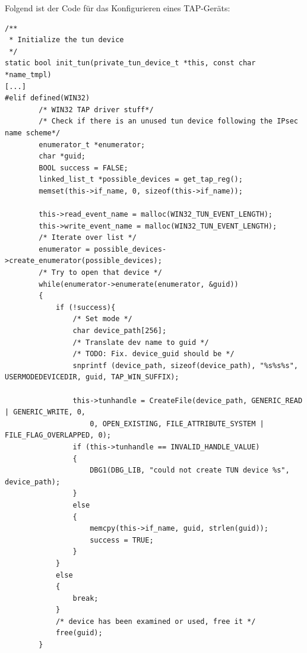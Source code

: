 Folgend ist der Code für das Konfigurieren eines TAP-Geräts:
\begin{lstlisting}[caption=Konfiguration eines TAP-Geräts]
/**
 * Initialize the tun device
 */
static bool init_tun(private_tun_device_t *this, const char *name_tmpl)
[...]
#elif defined(WIN32)
        /* WIN32 TAP driver stuff*/
        /* Check if there is an unused tun device following the IPsec name scheme*/
        enumerator_t *enumerator;
        char *guid;
        BOOL success = FALSE;
        linked_list_t *possible_devices = get_tap_reg();
        memset(this->if_name, 0, sizeof(this->if_name));

        this->read_event_name = malloc(WIN32_TUN_EVENT_LENGTH);
        this->write_event_name = malloc(WIN32_TUN_EVENT_LENGTH);
        /* Iterate over list */
        enumerator = possible_devices->create_enumerator(possible_devices);
        /* Try to open that device */
        while(enumerator->enumerate(enumerator, &guid))
        {
            if (!success){
                /* Set mode */
                char device_path[256];
                /* Translate dev name to guid */
                /* TODO: Fix. device_guid should be */
                snprintf (device_path, sizeof(device_path), "%s%s%s", USERMODEDEVICEDIR, guid, TAP_WIN_SUFFIX);

                this->tunhandle = CreateFile(device_path, GENERIC_READ | GENERIC_WRITE, 0,
                    0, OPEN_EXISTING, FILE_ATTRIBUTE_SYSTEM | FILE_FLAG_OVERLAPPED, 0);
                if (this->tunhandle == INVALID_HANDLE_VALUE)
                {
                    DBG1(DBG_LIB, "could not create TUN device %s", device_path);
                }
                else
                {
                    memcpy(this->if_name, guid, strlen(guid));
                    success = TRUE;
                }
            }
            else
            {
                break;
            }
            /* device has been examined or used, free it */
            free(guid);
        }


\end{lstlisting}
